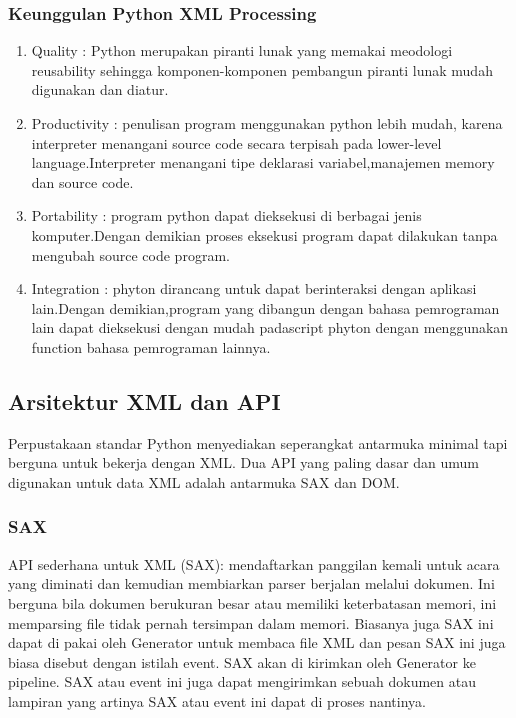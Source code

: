 \subsubsection{Keunggulan Python XML Processing}
\begin{enumerate}
Keunggulan dari python dapat dijabarkan dari faktor-faktor berikut ini :
\item Quality : Python merupakan piranti lunak yang memakai meodologi reusability sehingga komponen-komponen pembangun piranti      lunak mudah digunakan dan diatur.
\item Productivity : penulisan program menggunakan python lebih mudah, karena interpreter menangani source code secara terpisah pada lower-level language.Interpreter menangani tipe deklarasi variabel,manajemen memory dan source code.
\item Portability : program python dapat dieksekusi di berbagai jenis komputer.Dengan demikian proses eksekusi program dapat dilakukan tanpa mengubah source code program.
\item Integration : phyton dirancang untuk dapat berinteraksi dengan aplikasi lain.Dengan demikian,program yang dibangun dengan bahasa pemrograman lain dapat dieksekusi dengan mudah padascript phyton dengan menggunakan function bahasa pemrograman lainnya.
\end{enumerate}
 
\subsection {Arsitektur XML dan API}
  Perpustakaan standar Python menyediakan seperangkat antarmuka minimal tapi berguna untuk bekerja dengan XML. Dua API yang paling dasar dan umum digunakan untuk data XML adalah antarmuka SAX dan DOM. 
\subsubsection {SAX}
  API sederhana untuk XML (SAX): mendaftarkan panggilan kemali untuk acara yang diminati dan kemudian membiarkan parser berjalan melalui dokumen. Ini berguna bila dokumen berukuran besar atau memiliki keterbatasan memori, ini memparsing file tidak pernah tersimpan dalam memori. Biasanya juga SAX ini dapat di pakai oleh Generator untuk membaca file XML dan pesan SAX ini juga biasa disebut dengan istilah event. SAX akan di kirimkan oleh Generator ke pipeline. SAX atau event ini juga dapat mengirimkan sebuah dokumen atau lampiran yang artinya SAX atau event ini dapat di proses nantinya.
  
